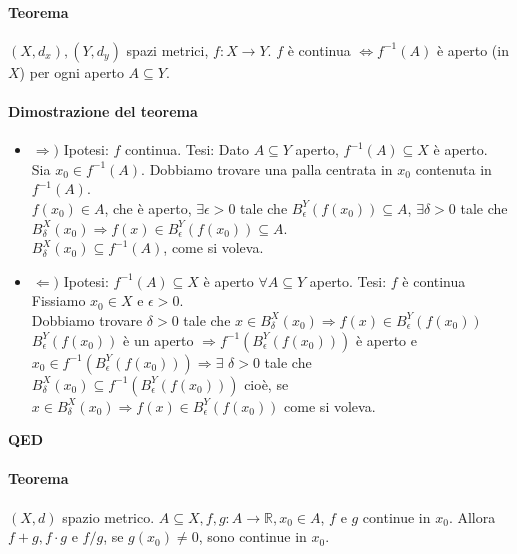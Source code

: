 \documentclass{article}
\newcommand{\R}{\mathbb{R}}
\begin{document}
\paragraph{{Teorema}}
$(X,d_x),(Y,d_y)$ spazi metrici, $f:X \rightarrow Y$. $f$ è continua $\Leftrightarrow f^{-1}(A)$ è aperto (in $X$) per ogni aperto $A \subseteq Y$.

\paragraph{{Dimostrazione del teorema}}
\begin{itemize}
    \item $\Rightarrow)$ Ipotesi: $f$ continua. Tesi: Dato $A \subseteq Y$ aperto, $f^{-1}(A)\subseteq X$ è aperto.\\
            Sia $x_0 \in f^{-1}(A)$. Dobbiamo trovare una palla centrata in $x_0$ contenuta in $f^{-1}(A)$.\\
            $f(x_0) \in A$, che è aperto, $\exists \epsilon >0$ tale che $B_{\epsilon}^{Y}(f(x_0))\subseteq A$, $\exists \delta >0 $ tale che $B_{\delta}^{X}(x_0) \Rightarrow f(x)\in B_{\epsilon}^{Y}(f(x_0))\subseteq A$.\\
            $B_{\delta}^{X}(x_0) \subseteq f^{-1} (A)$, come si voleva.
    \item $\Leftarrow)$ Ipotesi: $f^{-1}(A)\subseteq X$ è aperto $\forall A \subseteq Y$ aperto. Tesi: $f$ è continua\\
        Fissiamo $x_0 \in X$ e $\epsilon >0$.\\
        Dobbiamo trovare $\delta >0 $ tale che $x \in B_{\delta}^{X} (x_0) \Rightarrow f(x) \in B_{\epsilon}^{Y} (f(x_0))$\\
        $B_{\epsilon}^{Y} (f(x_0))$ è un aperto $\Rightarrow f^{-1}(B_{\epsilon}^{Y} (f(x_0)))$ è aperto e $x_0 \in f^{-1}(B_{\epsilon}^{Y} (f(x_0))) \Rightarrow \exists\,\, \delta >0 $ tale che $B_{\delta}^{X}(x_0) \subseteq f^{-1}(B_{\epsilon}^{Y}(f(x_0)))$ cioè, se $x \in B_{\delta}^{X}(x_0) \Rightarrow f(x) \in B_{\epsilon}^{Y}(f(x_0))$ come si voleva.
\end{itemize}
\begin{flushright}
\textbf{QED}
\end{flushright}

\paragraph{{Teorema}}
$(X,d)$ spazio metrico. $A \subseteq X, f,g: A \rightarrow \R, x_0 \in A$, $f$ e $g$ continue in $x_0$. Allora $f+g, f\cdot g$ e $f/g$, se $g(x_0)\neq 0$, sono continue in $x_0$.
\end{document}
